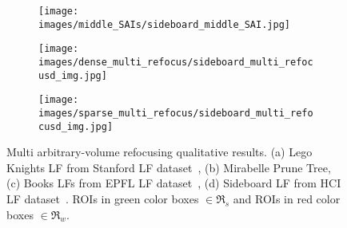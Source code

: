 \begin{figure*}[!p]
    \begin{subfigure}[t]{0.29\textwidth}
         \centering
         \texttt{[image: images/middle\_SAIs/sideboard\_middle\_SAI.jpg]}
     \end{subfigure}
     \hspace{0.1cm}
    \begin{subfigure}[t]{0.29\textwidth}
         \centering
         \texttt{[image: images/dense\_multi\_refocus/sideboard\_multi\_refocusd\_img.jpg]}
         \caption{}
     \end{subfigure}
     \hspace{0.1cm}
     \begin{subfigure}[t]{0.29\textwidth}
         \centering
         \texttt{[image: images/sparse\_multi\_refocus/sideboard\_multi\_refocusd\_img.jpg]}
     \end{subfigure}
     
     
    \caption{Multi arbitrary-volume refocusing qualitative results. (a) Lego Knights LF from Stanford LF dataset~\cite{stanfordnewdataset}, (b) Mirabelle Prune Tree, (c) Books LFs from EPFL LF dataset~\cite{epfldataset}, (d) Sideboard LF from HCI LF dataset~\cite{hcidataset}. ROIs in green color boxes $\in \mathfrak{R}_{s}$ and ROIs in red color boxes $\in \mathfrak{R}_{w}$.}
    \label{fig:qualitative}
\end{figure*}



        
